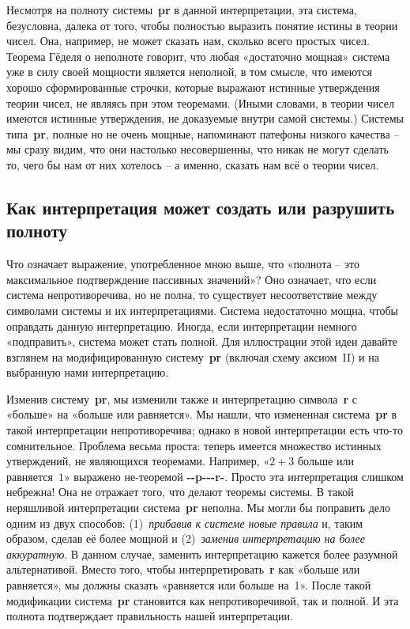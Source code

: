 \documentclass[../main.tex]{subfiles}
\begin{document}
Несмотря на полноту системы~\textbf{pr} в данной интерпретации, эта система, безусловна, далека от того, чтобы полностью выразить понятие истины в теории чисел. Она, например, не может сказать нам, сколько всего простых чисел. Теорема Гёделя о неполноте говорит, что любая «достаточно мощная» система уже в силу своей мощности является неполной, в том смысле, что имеются хорошо сформированные строчки, которые выражают истинные утверждения теории чисел, не являясь при этом теоремами. (Иными словами, в теории чисел имеются истинные утверждения, не доказуемые внутри самой системы.) Системы типа~\textbf{pr}, полные но не очень мощные, напоминают патефоны низкого качества \--- мы сразу видим, что они настолько несовершенны, что никак не могут сделать то, чего бы нам от них хотелось \--- а именно, сказать нам всё о теории чисел.


\subsection{Как интерпретация может создать или разрушить полноту}

Что означает выражение, употребленное мною выше, что «полнота \--- это максимальное подтверждение пассивных значений»? Оно означает, что если система непротиворечива, но не полна, то существует несоответствие между символами системы и их интерпретациями. Система недостаточно мощна, чтобы оправдать данную интерпретацию. Иногда, если интерпретации немного «подправить», система может стать полной. Для иллюстрации этой идеи давайте взглянем на модифицированную систему~\textbf{pr} (включая схему аксиом~II) и на выбранную нами интерпретацию.

Изменив систему~\textbf{pr}, мы изменили также и интерпретацию символа~\textbf{r} с «больше» на «больше или равняется». Мы нашли, что измененная система~\textbf{pr} в такой интерпретации непротиворечива; однако в новой интерпретации есть что-то сомнительное. Проблема весьма проста: теперь имеется множество истинных утверждений, не являющихся теоремами. Например, «$2 + 3$ больше или равняется~$1$» выражено не-теоремой \textbf{-{}-p-{}-{}-r-}. Просто эта интерпретация слишком небрежна! Она не отражает того, что делают теоремы системы. В такой неряшливой интерпретации система~\textbf{pr} неполна. Мы могли бы поправить дело одним из двух способов: (1)~\emph{прибавив к системе новые правила} и, таким образом, сделав её более мощной и (2)~\emph{заменив интерпретацию на более аккуратную}. В данном случае, заменить интерпретацию кажется более разумной альтернативой. Вместо того, чтобы интерпретировать~\textbf{r} как «больше или равняется», мы должны сказать «равняется или больше на~1». После такой модификации система~\textbf{pr} становится как непротиворечивой, так и полной. И эта полнота подтверждает правильность нашей интерпретации.
\end{document}
